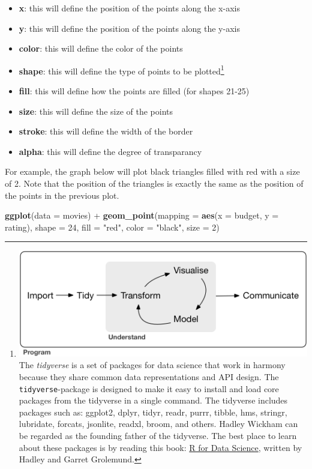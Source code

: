 \documentclass[]{tufte-book}
\newenvironment{Shaded}{}{}
\newcommand{\DataTypeTok}[1]{\textcolor[rgb]{0.56,0.13,0.00}{#1}}
\newcommand{\DecValTok}[1]{\textcolor[rgb]{0.25,0.63,0.44}{#1}}
\newcommand{\KeywordTok}[1]{\textcolor[rgb]{0.00,0.44,0.13}{\textbf{#1}}}
\newcommand{\NormalTok}[1]{#1}
\newcommand{\OperatorTok}[1]{\textcolor[rgb]{0.40,0.40,0.40}{#1}}
\newcommand{\StringTok}[1]{\textcolor[rgb]{0.25,0.44,0.63}{#1}}
\providecommand{\tightlist}{%
  \setlength{\itemsep}{0pt}\setlength{\parskip}{0pt}}
\begin{document}
\begin{itemize}
\tightlist
\item
  \textbf{x}: this will define the position of the points along the x-axis
\item
  \textbf{y}: this will define the position of the points along the y-axis
\item
  \textbf{color}: this will define the color of the points
\item
  \textbf{shape}: this will define the type of points to be plotted\footnote{\includegraphics{images/tidyverse.png} The \emph{tidyverse} is a set of packages for data science that work in harmony because they share common data representations and API design. The \texttt{tidyverse}-package is designed to make it easy to install and load core packages from the tidyverse in a single command. The tidyverse includes packages such as: ggplot2, dplyr, tidyr, readr, purrr, tibble, hms, stringr, lubridate, forcats, jsonlite, readxl, broom, and others. Hadley Wickham can be regarded as the founding father of the tidyverse. The best place to learn about these packages is by reading this book: \href{http://r4ds.had.co.nz/}{R for Data Science}, written by Hadley and Garret Grolemund.}
\item
  \textbf{fill}: this will define how the points are filled (for shapes 21-25)
\item
  \textbf{size}: this will define the size of the points
\item
  \textbf{stroke}: this will define the width of the border
\item
  \textbf{alpha}: this will define the degree of transparancy
\end{itemize}

For example, the graph below will plot black triangles filled with red with a size of 2. Note that the position of the triangles is exactly the same as the position of the points in the previous plot.

\begin{Shaded}
\begin{Highlighting}[]
\KeywordTok{ggplot}\NormalTok{(}\DataTypeTok{data =}\NormalTok{ movies) }\OperatorTok{+}
\StringTok{    }\KeywordTok{geom_point}\NormalTok{(}\DataTypeTok{mapping =} \KeywordTok{aes}\NormalTok{(}\DataTypeTok{x =}\NormalTok{ budget, }\DataTypeTok{y =}\NormalTok{ rating), }
               \DataTypeTok{shape =} \DecValTok{24}\NormalTok{, }
               \DataTypeTok{fill =} \StringTok{"red"}\NormalTok{, }
               \DataTypeTok{color =} \StringTok{"black"}\NormalTok{, }
               \DataTypeTok{size =} \DecValTok{2}\NormalTok{)}
\end{Highlighting}
\end{Shaded}
\end{document}
